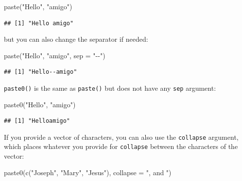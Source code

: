 \documentclass[
]{article}
\newenvironment{Shaded}{\begin{snugshade}}{\end{snugshade}}
\newcommand{\AttributeTok}[1]{\textcolor[rgb]{0.77,0.63,0.00}{#1}}
\newcommand{\FunctionTok}[1]{\textcolor[rgb]{0.00,0.00,0.00}{#1}}
\newcommand{\NormalTok}[1]{#1}
\newcommand{\StringTok}[1]{\textcolor[rgb]{0.31,0.60,0.02}{#1}}
\begin{document}
\begin{Shaded}
\begin{Highlighting}[]
\FunctionTok{paste}\NormalTok{(}\StringTok{"Hello"}\NormalTok{, }\StringTok{"amigo"}\NormalTok{)}
\end{Highlighting}
\end{Shaded}

\begin{verbatim}
## [1] "Hello amigo"
\end{verbatim}

but you can also change the separator if needed:

\begin{Shaded}
\begin{Highlighting}[]
\FunctionTok{paste}\NormalTok{(}\StringTok{"Hello"}\NormalTok{, }\StringTok{"amigo"}\NormalTok{, }\AttributeTok{sep =} \StringTok{"{-}{-}"}\NormalTok{)}
\end{Highlighting}
\end{Shaded}

\begin{verbatim}
## [1] "Hello--amigo"
\end{verbatim}

\texttt{paste0()} is the same as \texttt{paste()} but does not have any \texttt{sep} argument:

\begin{Shaded}
\begin{Highlighting}[]
\FunctionTok{paste0}\NormalTok{(}\StringTok{"Hello"}\NormalTok{, }\StringTok{"amigo"}\NormalTok{)}
\end{Highlighting}
\end{Shaded}

\begin{verbatim}
## [1] "Helloamigo"
\end{verbatim}

If you provide a vector of characters, you can also use the \texttt{collapse} argument,
which places whatever you provide for \texttt{collapse} between the
characters of the vector:

\begin{Shaded}
\begin{Highlighting}[]
\FunctionTok{paste0}\NormalTok{(}\FunctionTok{c}\NormalTok{(}\StringTok{"Joseph"}\NormalTok{, }\StringTok{"Mary"}\NormalTok{, }\StringTok{"Jesus"}\NormalTok{), }\AttributeTok{collapse =} \StringTok{", and "}\NormalTok{)}
\end{Highlighting}
\end{Shaded}
\end{document}
